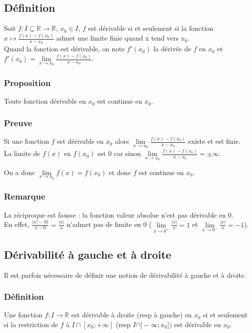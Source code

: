 \documentclass[a4paper,10pt]{book} %
\newcommand{\R}{\mathbb{R}}
\begin{document}
\subsection{Définition}
Soit $f : I\subseteq\R \rightarrow \R$, $x_{0}\in I$, $f$ est dérivable si et seulement si la fonction $x\mapsto \frac{f(x)-f(x_{0})}{x-x_{0}}$ admet une limite finie quand x tend vers $x_{0}$.\\

Quand la fonction est dérivable, on note $f'(x_{0})$ la dérivée de $f$ en $x_{0}$ et $f'(x_{0})=\lim\limits_{x\rightarrow x_0}\frac{f(x)-f(x_{0})}{x-x_{0}}$.

\subsubsection{Proposition}
Toute fonction dérivable en $x_{0}$ est continue en $x_{0}$.

\subsubsection{Preuve}
Si une fonction $f$ est dérivable en $x_{0}$ alors $\lim\limits_{x\rightarrow x_0}\frac{f(x)-f(x_{0})}{x-x_{0}}$ existe et est finie.\\
La limite de $f(x)$ en $f(x_{0})$ est $0$ car sinon $\lim\limits_{x\rightarrow x_0}\frac{f(x)-f(x_{0})}{x-x_{0}}=\pm\infty$.

On a donc $\lim\limits_{x\rightarrow x_{0}} f(x)=f(x_{0})$ et donc $f$ est continue en $x_{0}$.

\subsubsection{Remarque}
La réciproque est fausse : la fonction valeur absolue n'est pas dérivable en 0.\\

En effet, $\frac{|x|-|0|}{x-0}=\frac{|x|}{x}$ n'admet pas de limite en 0 ($\lim\limits_{x\rightarrow 0^{+}} \frac{|x|}{x}=1$ et $\lim\limits_{x\rightarrow 0^{-}} \frac{|x|}{x}=-1$).


\subsection{Dérivabilité à gauche et à droite}
Il est parfois nécessaire de définir une notion de dérivabilité à gauche et à droite.

\subsubsection{Définition}
Une fonction $f:I\rightarrow \R$ est dérivable à droite (resp à gauche) en $x_{0}$ si et seulement si la restriction de $f$ à $I\cap [x_{0};+\infty]$ (resp $I\cap ]-\infty;x_{0}])$ est dérivable en $x_{0}$.\\
\end{document}
